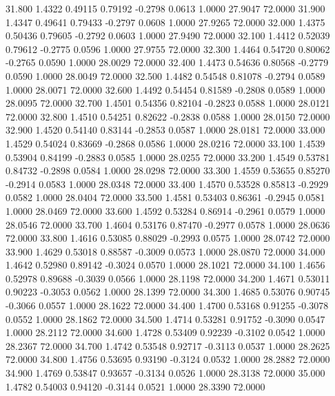   31.800   1.4322   0.49115   0.79192  -0.2798   0.0613   1.0000  27.9047  72.0000
  31.900   1.4347   0.49641   0.79433  -0.2797   0.0608   1.0000  27.9265  72.0000
  32.000   1.4375   0.50436   0.79605  -0.2792   0.0603   1.0000  27.9490  72.0000
  32.100   1.4412   0.52039   0.79612  -0.2775   0.0596   1.0000  27.9755  72.0000
  32.300   1.4464   0.54720   0.80062  -0.2765   0.0590   1.0000  28.0029  72.0000
  32.400   1.4473   0.54636   0.80568  -0.2779   0.0590   1.0000  28.0049  72.0000
  32.500   1.4482   0.54548   0.81078  -0.2794   0.0589   1.0000  28.0071  72.0000
  32.600   1.4492   0.54454   0.81589  -0.2808   0.0589   1.0000  28.0095  72.0000
  32.700   1.4501   0.54356   0.82104  -0.2823   0.0588   1.0000  28.0121  72.0000
  32.800   1.4510   0.54251   0.82622  -0.2838   0.0588   1.0000  28.0150  72.0000
  32.900   1.4520   0.54140   0.83144  -0.2853   0.0587   1.0000  28.0181  72.0000
  33.000   1.4529   0.54024   0.83669  -0.2868   0.0586   1.0000  28.0216  72.0000
  33.100   1.4539   0.53904   0.84199  -0.2883   0.0585   1.0000  28.0255  72.0000
  33.200   1.4549   0.53781   0.84732  -0.2898   0.0584   1.0000  28.0298  72.0000
  33.300   1.4559   0.53655   0.85270  -0.2914   0.0583   1.0000  28.0348  72.0000
  33.400   1.4570   0.53528   0.85813  -0.2929   0.0582   1.0000  28.0404  72.0000
  33.500   1.4581   0.53403   0.86361  -0.2945   0.0581   1.0000  28.0469  72.0000
  33.600   1.4592   0.53284   0.86914  -0.2961   0.0579   1.0000  28.0546  72.0000
  33.700   1.4604   0.53176   0.87470  -0.2977   0.0578   1.0000  28.0636  72.0000
  33.800   1.4616   0.53085   0.88029  -0.2993   0.0575   1.0000  28.0742  72.0000
  33.900   1.4629   0.53018   0.88587  -0.3009   0.0573   1.0000  28.0870  72.0000
  34.000   1.4642   0.52980   0.89142  -0.3024   0.0570   1.0000  28.1021  72.0000
  34.100   1.4656   0.52978   0.89688  -0.3039   0.0566   1.0000  28.1198  72.0000
  34.200   1.4671   0.53011   0.90223  -0.3053   0.0562   1.0000  28.1399  72.0000
  34.300   1.4685   0.53076   0.90745  -0.3066   0.0557   1.0000  28.1622  72.0000
  34.400   1.4700   0.53168   0.91255  -0.3078   0.0552   1.0000  28.1862  72.0000
  34.500   1.4714   0.53281   0.91752  -0.3090   0.0547   1.0000  28.2112  72.0000
  34.600   1.4728   0.53409   0.92239  -0.3102   0.0542   1.0000  28.2367  72.0000
  34.700   1.4742   0.53548   0.92717  -0.3113   0.0537   1.0000  28.2625  72.0000
  34.800   1.4756   0.53695   0.93190  -0.3124   0.0532   1.0000  28.2882  72.0000
  34.900   1.4769   0.53847   0.93657  -0.3134   0.0526   1.0000  28.3138  72.0000
  35.000   1.4782   0.54003   0.94120  -0.3144   0.0521   1.0000  28.3390  72.0000
